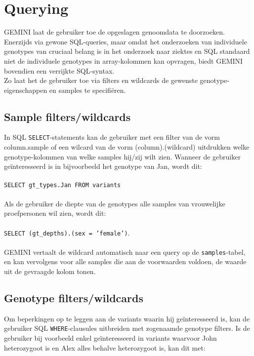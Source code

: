 \section{Querying}

GEMINI laat de gebruiker toe de opgeslagen genoomdata te doorzoeken. Enerzijds via gewone SQL-queries, maar omdat het onderzoeken van individuele genotypes van cruciaal belang is in het onderzoek naar ziektes en SQL standaard niet de individuele genotypes in array-kolommen kan opvragen, biedt GEMINI bovendien een verrijkte SQL-syntax.\\
Zo laat het de gebruiker toe via filters en wildcards de gewenste genotype-eigenschappen en samples te specifi\"eren.

\subsection{Sample filters/wildcards} 
In SQL \texttt{SELECT}-statements kan de gebruiker met een filter van de vorm column.sample of een wilcard van de vorm (column).(wildcard) uitdrukken welke genotype-kolommen van welke samples hij/zij wilt zien. Wanneer de gebruiker ge\"interesseerd is in bijvoorbeeld het genotype van Jan, wordt dit:\\\\
\texttt{SELECT gt\_types.Jan FROM variants}\\\\
Als de gebruiker de diepte van de genotypes alle samples van vrouwelijke proefpersonen wil zien, wordt dit:\\\\
\texttt{SELECT (gt\_depths).(sex = 'female')}.\\\\
GEMINI vertaalt de wildcard automatisch naar een query op de \texttt{samples}-tabel, en kan vervolgens voor alle samples die aan de voorwaarden voldoen, de waarde uit de gevraagde kolom tonen.

\subsection{Genotype filters/wildcards}
Om beperkingen op te leggen aan de variants waarin hij ge\"interesseerd is, kan de gebruiker SQL \texttt{WHERE}-clausules uitbreiden met zogenaamde genotype filters. Is de gebruiker bij voorbeeld enkel ge\"interesseerd in variants waarvoor John heterozygoot is en Alex alles behalve heterozygoot is, kan dit met:\\

